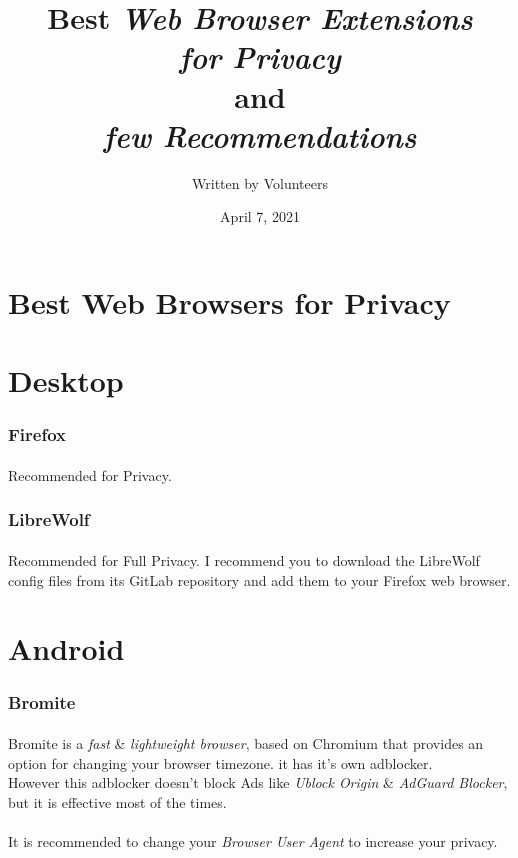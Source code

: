 \documentclass[12pt, a4paper]{article}
\title{Best \emph{Web Browser Extensions}\\\emph{for Privacy}\\and\\\emph{few Recommendations}}
\author{Written by Volunteers}
\date{April 7, 2021}
\begin{document}
\maketitle

\section*{Best Web Browsers for Privacy}
\section*{Desktop}
\subsubsection*{Firefox}
\paragraph{}
Recommended for Privacy.
\subsubsection*{LibreWolf}
\paragraph{}
Recommended for Full Privacy. I recommend you to download the LibreWolf config files from its GitLab repository and add them to your Firefox web browser.

\section*{Android}
\subsubsection*{Bromite}
\paragraph{}
Bromite is a \emph{fast} \& \emph{lightweight browser}, based on Chromium that provides an option for changing your browser timezone. it has it's own adblocker.\\
However this adblocker doesn't block Ads like \emph{Ublock Origin} \& \emph{AdGuard Blocker}, but it is effective most of the times.

\paragraph{}
It is recommended to change your \emph{Browser User Agent} to increase your privacy.
\end{document}
